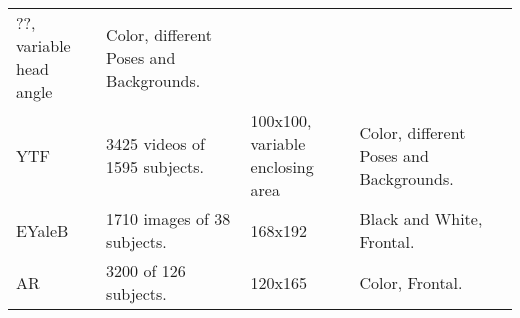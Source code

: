 \documentclass[17pt,]{extarticle}
\begin{document}
\begin{longtable}[]{@{}lllll@{}}
\begin{minipage}[t]{0.14\columnwidth}
??, variable head angle\strut
\end{minipage} & \begin{minipage}[t]{0.19\columnwidth}\raggedright
Color, different Poses and Backgrounds.\strut
\end{minipage} & \begin{minipage}[t]{0.20\columnwidth}\raggedright
\autocite{huang2008}\strut
\end{minipage}\tabularnewline
\begin{minipage}[t]{0.09\columnwidth}\raggedright
YTF\strut
\end{minipage} & \begin{minipage}[t]{0.24\columnwidth}\raggedright
3425 videos of 1595 subjects.\strut
\end{minipage} & \begin{minipage}[t]{0.14\columnwidth}\raggedright
100x100, variable enclosing area\strut
\end{minipage} & \begin{minipage}[t]{0.19\columnwidth}\raggedright
Color, different Poses and Backgrounds.\strut
\end{minipage} & \begin{minipage}[t]{0.20\columnwidth}\raggedright
\autocite{wolf2011}\strut
\end{minipage}\tabularnewline
\begin{minipage}[t]{0.09\columnwidth}\raggedright
EYaleB\strut
\end{minipage} & \begin{minipage}[t]{0.24\columnwidth}\raggedright
1710 images of 38 subjects.\strut
\end{minipage} & \begin{minipage}[t]{0.14\columnwidth}\raggedright
168x192\strut
\end{minipage} & \begin{minipage}[t]{0.19\columnwidth}\raggedright
Black and White, Frontal.\strut
\end{minipage} & \begin{minipage}[t]{0.20\columnwidth}\raggedright
\autocite{sanchez2006}\strut
\end{minipage}\tabularnewline
\begin{minipage}[t]{0.09\columnwidth}\raggedright
AR\strut
\end{minipage} & \begin{minipage}[t]{0.24\columnwidth}\raggedright
3200 of 126 subjects.\strut
\end{minipage} & \begin{minipage}[t]{0.14\columnwidth}\raggedright
120x165\strut
\end{minipage} & \begin{minipage}[t]{0.19\columnwidth}\raggedright
Color, Frontal.\strut
\end{minipage} & \begin{minipage}[t]{0.20\columnwidth}\raggedright
\autocite{mart1998}\strut
\end{minipage}\tabularnewline
\bottomrule
\end{longtable}
\end{document}
